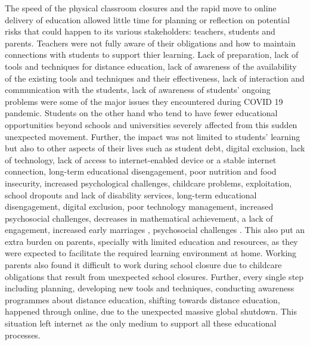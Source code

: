 \documentclass[11pt,a4paper,]{article}
\begin{document}
The speed of the physical classroom closures and the rapid move to online delivery of education allowed little time for planning or reflection on potential risks that could happen to its various stakeholders: teachers, students and parents. Teachers were not fully aware of their obligations and how to maintain connections with students to support thier learning. Lack of preparation, lack of tools and techniques for distance education, lack of awareness of the availability of the existing tools and techniques and their effectiveness, lack of interaction and communication with the students, lack of awareness of students' ongoing problems were some of the major issues they encountered during COVID 19 pandemic. Students on the other hand who tend to have fewer educational opportunities beyond schools and universities severely affected from this sudden unexpected movement. Further, the impact was not limited to students' learning but also to other aspects of their lives such as student debt, digital exclusion, lack of technology, lack of access to internet-enabled device or a stable internet connection, long-term educational disengagement, poor nutrition and food insecurity, increased psychological challenges, childcare problems, exploitation, school dropouts and lack of disability services, long-term educational disengagement, digital exclusion, poor technology management, increased psychosocial challenges, decreases in mathematical achievement, a lack of engagement, increased early marriages , psychosocial challenges \autocite{drane2020impact,daniel2020education,unescoadverse2020,richmond2020critical,carter2021teacher}. This also put an extra burden on parents, specially with limited education and resources, as they were expected to facilitate the required learning environment at home. Working parents also found it difficult to work during school closure due to childcare obligations that result from unexpected school closures. Further, every single step including planning, developing new tools and techniques, conducting awareness programmes about distance education, shifting towards distance education, happened through online, due to the unexpected massive global shutdown. This situation left internet as the only medium to support all these educational processes.
\end{document}

